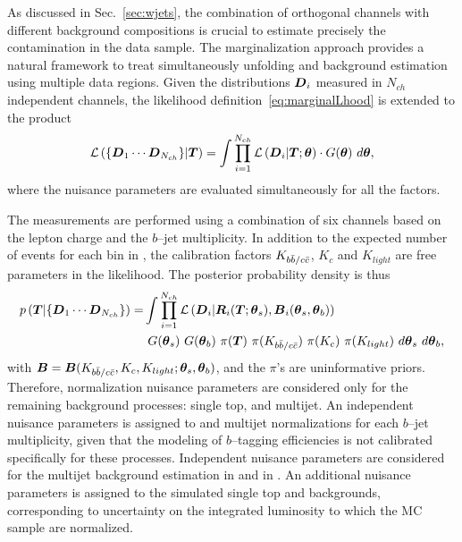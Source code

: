 As discussed in Sec.~\ref{sec:wjets}, the combination of
orthogonal channels with different background compositions is crucial
to estimate precisely the \wjets{} contamination in the \eighttev{}
data sample.
The marginalization approach provides a natural framework to treat
simultaneously unfolding and background estimation using
multiple data regions. Given the distributions $\boldsymbol{D}{}_i$ measured in $N_{ch}$
independent channels, the likelihood definition~\ref{eq:marginalLhood}
is extended to the product  
\begin{equation}
  \mathcal{L}\left(\{\boldsymbol{D}{}_1\cdots{}\boldsymbol{D}{}_{N_{ch}}\}|\boldsymbol{T}{}\right)=
  \int
  \prod_{i=1}^{N_{ch}}\mathcal{L}\left(\boldsymbol{D}{}_i|\boldsymbol{T}{};\boldsymbol{\theta}{}\right) 
  \cdot{} G(\boldsymbol{\theta}{})
  ~d\boldsymbol{\theta}{},
\end{equation}
where the nuisance parameters are evaluated simultaneously for all the
factors.

The \eighttev{} measurements are
performed using a combination of six channels based on
the lepton charge and the $b$--jet multiplicity. In addition to the
expected number of \ttbar{} events for each bin in \Truth{}, the
\wjets{} calibration factors $K_{b\bar{b}{}/c\bar{c}{}}$, $K_c$ and $K_{light}$ are free
parameters in the likelihood.
The posterior probability density is thus
\begin{equation}
\begin{split}
  p\left(\boldsymbol{T}{}|\{\boldsymbol{D}{}_1\cdots{}\boldsymbol{D}{}_{N_{ch}}\}\right)=&
  \int
  \prod_{i=1}^{N_{ch}}\mathcal{L}\left(\boldsymbol{D}{}_i|\boldsymbol{R}{}_i(\boldsymbol{T}{};\boldsymbol{\theta}{}_s),\boldsymbol{B}{}_i(\boldsymbol{\theta}{}_s,\boldsymbol{\theta}{}_b)\right)  \\
&  ~G(\boldsymbol{\theta}{}_s)
  ~G(\boldsymbol{\theta}{}_b)
  ~\pi{}(\boldsymbol{T}{})
  ~\pi{}(K_{b\bar{b}{}/c\bar{c}{}})
  ~\pi{}(K_c)
  ~\pi{}(K_{light})
  ~d\boldsymbol{\theta}{}_s
  ~d\boldsymbol{\theta}{}_b,\\
\end{split}
\end{equation}
with
$\boldsymbol{B}{}=\boldsymbol{B}{}(K_{b\bar{b}{}/c\bar{c}{}},K_c,K_{light};\boldsymbol{\theta}_s,\boldsymbol{\theta}{}_b)$,
and the $\pi{}$'s are uninformative priors.
Therefore, normalization nuisance parameters are considered
only for the remaining background processes: single top, \zjets{} and
multijet. An independent nuisance parameters is assigned to \zjets{}
and multijet normalizations for each $b$--jet multiplicity, given that
the modeling of $b$--tagging efficiencies is not calibrated
specifically for these processes. Independent nuisance parameters are
considered for the multijet background estimation in \mujets{} and in
\ejets{}. An additional nuisance parameters is
assigned to the simulated single top and \zjets{} backgrounds,
corresponding to uncertainty on the integrated luminosity to which the
MC sample are normalized.

